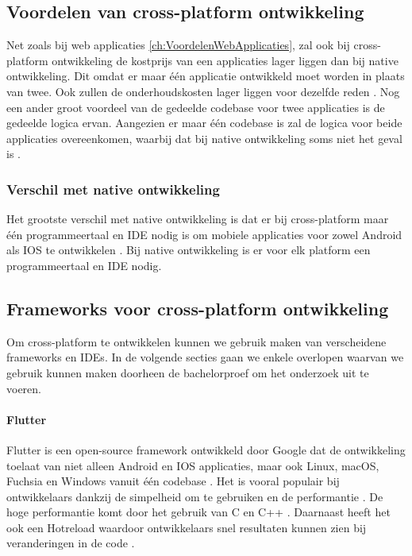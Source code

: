 \subsection{Voordelen van cross-platform ontwikkeling}
Net zoals bij web applicaties \ref{ch:VoordelenWebApplicaties}, zal ook bij cross-platform 
ontwikkeling de kostprijs van een applicaties lager liggen dan bij native ontwikkeling. 
Dit omdat er maar één applicatie ontwikkeld moet worden in plaats van twee. Ook zullen de 
onderhoudskosten lager liggen voor dezelfde reden \autocite{Terekhov2022}. Nog een ander 
groot voordeel van de gedeelde codebase voor twee applicaties is de gedeelde logica ervan. 
Aangezien er maar één codebase is zal de logica voor beide applicaties overeenkomen, waarbij 
dat bij native ontwikkeling soms niet het geval is \autocite{Kotlin2023}.

\subsubsection{Verschil met native ontwikkeling}
Het grootste verschil met native ontwikkeling is dat er bij cross-platform maar één 
programmeertaal en IDE nodig is om mobiele applicaties voor zowel Android als IOS te 
ontwikkelen \autocite{Hu2021}. Bij native ontwikkeling is er voor elk platform een 
programmeertaal en IDE nodig. 

\subsection{Frameworks voor cross-platform ontwikkeling}
Om cross-platform te ontwikkelen kunnen we gebruik maken van verscheidene frameworks en 
IDEs. In de volgende secties gaan we enkele overlopen waarvan we gebruik kunnen maken 
doorheen de bachelorproef om het onderzoek uit te voeren.

\paragraph{Flutter}
Flutter is een open-source framework ontwikkeld door Google dat de ontwikkeling toelaat 
van niet alleen Android en IOS applicaties, maar ook Linux, macOS, Fuchsia en Windows 
vanuit één codebase \autocite{Okeke2022a}. Het is vooral populair bij ontwikkelaars 
dankzij de simpelheid om te gebruiken en de performantie \autocite{Sakovich22023}. De 
hoge performantie komt door het gebruik van C en C++ \autocite{Terekhov2022}. Daarnaast 
heeft het ook een \Gls{Hotreload} waardoor ontwikkelaars snel resultaten kunnen zien bij 
veranderingen in de code \autocite{Sakovich22023}.

